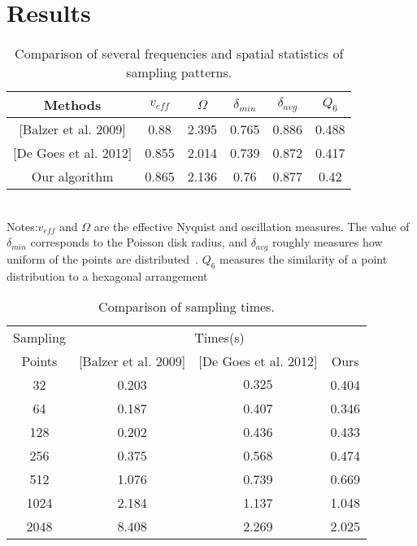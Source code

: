 \section{Results}

\begin{table}
\caption{\label{comparing-table}
Comparison of several frequencies and spatial statistics of sampling patterns.
}

 \begin{tabular}{c|c|c|c|c|c}

  \hline
   Methods & $v_{eff}$ & $\Omega$ & $\delta_{min}$ & $\delta_{avg}$ & $Q_6$ \\ \hline
  {[Balzer et al. 2009]}& 0.88& 2.395 & 0.765 & 0.886 & 0.488 \\
  {[De Goes et al. 2012]} & 0.855 & 2.014 & 0.739 & 0.872 & 0.417 \\
   Our algorithm & 0.865 & 2.136 & 0.76 & 0.877 & 0.42 \\ \hline
  \end{tabular}\\
  Notes:$v_{eff} $ and $\Omega$ are the effective Nyquist and oscillation measures.
The value of $\delta_{min}$ corresponds to the Poisson disk radius,
and $\delta_{avg}$ roughly measures how uniform of the points are distributed~\cite{schlomer:2011:farthest}.
$Q_6$ measures the similarity of a point distribution to a hexagonal arrangement~\cite{kansal:2000:nonequilibrium}
\end{table}



\begin{table}
\caption{\label{time-table-singleclass}
Comparison of sampling times.
}

 \begin{tabular}{c|c|c|c}
 {Sampling} &
 \multicolumn{3}{c}{ Times(s)} \\ \cline{2-4}
  Points & [Balzer et al. 2009] & [De Goes et al. 2012] & Ours \\  \hline



   32 &   0.203 & $0.325$ & 0.404 \\ \hline
   64 & 0.187 & 0.407 & 0.346  \\ \hline
   128 &  0.202 & 0.436 & 0.433  \\ \hline
   256 &  0.375 & 0.568 & 0.474  \\ \hline
   512 & 1.076 & 0.739 & 0.669  \\ \hline
   1024 & 2.184 & 1.137 & 1.048  \\ \hline
   2048 &  8.408 & 2.269 & 2.025  \\ \hline

  \end{tabular}\\
\end{table}


